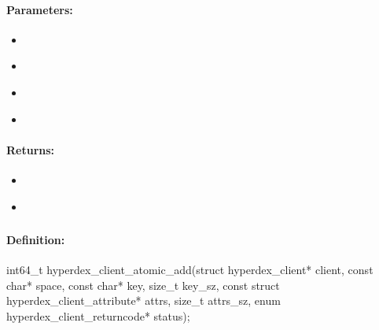 \paragraph{Parameters:}
\begin{itemize}[noitemsep]
\item {}\\

\item {}\\

\item {}\\

\item {}\\

\end{itemize}

\paragraph{Returns:}
\begin{itemize}[noitemsep]
\item {}\\

\item {}\\

\end{itemize}

\pagebreak
\subsubsection{}
\label{api:c:atomic_add}


\paragraph{Definition:}
\begin{ccode}
int64_t hyperdex_client_atomic_add(struct hyperdex_client* client,
        const char* space,
        const char* key, size_t key_sz,
        const struct hyperdex_client_attribute* attrs, size_t attrs_sz,
        enum hyperdex_client_returncode* status);
\end{ccode}

